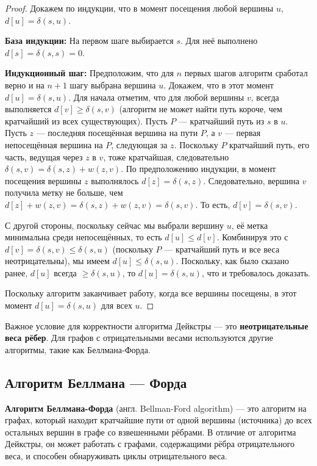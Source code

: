 \begin{proof}
	Докажем по индукции, что в момент посещения любой вершины $u$, $d[u] = \delta(s,u)$.
	
	\textbf{База индукции:}
	На первом шаге выбирается $s$. Для неё выполнено $d[s] = \delta(s,s) = 0$.
	
	\textbf{Индукционный шаг:}
	Предположим, что для $n$ первых шагов алгоритм сработал верно и на $n+1$ шагу выбрана вершина $u$. Докажем, что в этот момент $d[u] = \delta(s,u)$.
	Для начала отметим, что для любой вершины $v$, всегда выполняется $d[v] \ge \delta(s,v)$ (алгоритм не может найти путь короче, чем кратчайший из всех существующих).
	Пусть $P$ --- кратчайший путь из $s$ в $u$.
	Пусть $z$ --- последняя посещённая вершина на пути $P$, а $v$ --- первая непосещённая вершина на $P$, следующая за $z$.
	Поскольку $P$ кратчайший путь, его часть, ведущая через $z$ в $v$, тоже кратчайшая, следовательно $\delta(s,v) = \delta(s,z) + w(z,v)$.
	По предположению индукции, в момент посещения вершины $z$ выполнялось $d[z] = \delta(s,z)$.
	Следовательно, вершина $v$ получила метку не больше, чем $d[z] + w(z,v) = \delta(s,z) + w(z,v) = \delta(s,v)$. То есть, $d[v] = \delta(s,v)$.
	
	С другой стороны, поскольку сейчас мы выбрали вершину $u$, её метка минимальна среди непосещённых, то есть $d[u] \le d[v]$.
	Комбинируя это с $d[v] = \delta(s,v) \le \delta(s,u)$ (поскольку $P$ --- кратчайший путь и все веса неотрицательны), мы имеем $d[u] \le \delta(s,u)$.
	Поскольку, как было сказано ранее, $d[u]$ всегда $\ge \delta(s,u)$,
	то $d[u] = \delta(s,u)$, что и требовалось доказать.
	
	Поскольку алгоритм заканчивает работу, когда все вершины посещены, в этот момент $d[u] = \delta(s,u)$ для всех $u$.
\end{proof}

\begin{remark}
	Важное условие для корректности алгоритма Дейкстры --- это \textbf{неотрицательные веса рёбер}. Для графов с отрицательными весами используются другие алгоритмы, такие как Беллмана-Форда.
\end{remark}

\subsection{Алгоритм Беллмана --- Форда}

\begin{definition}
	\textbf{Алгоритм Беллмана-Форда} (англ. Bellman-Ford algorithm) --- это алгоритм на графах, который находит кратчайшие пути от одной вершины (источника) до всех остальных вершин в графе со взвешенными рёбрами. В отличие от алгоритма Дейкстры, он может работать с графами, содержащими рёбра отрицательного веса, и способен обнаруживать циклы отрицательного веса.
\end{definition}

